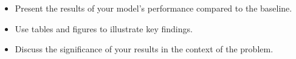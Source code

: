 \begin{itemize}
        \item Present the results of your model's performance compared to the baseline.
        \item Use tables and figures to illustrate key findings.
        \item Discuss the significance of your results in the context of the problem.
    \end{itemize}